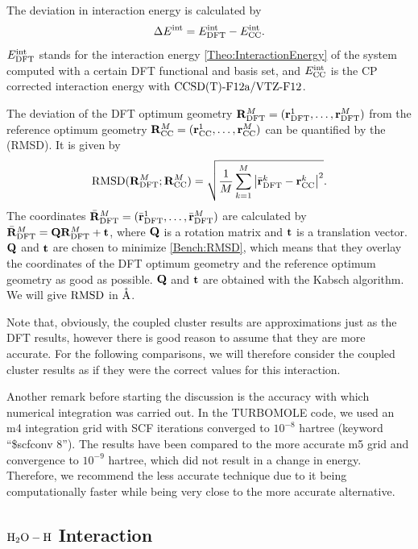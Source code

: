 The deviation in interaction energy is calculated by 
\newcommand\ecc{\enmat{\eint_{\te {CC}}}}
\begin{equation}
\Dl\eint=\eint\dft-\ecc.
\label{Bench:RefEnergy}
\end{equation}
$E^{\text{int}}_{\text{DFT}}$ stands for the interaction energy \eqref{Theo:InteractionEnergy} of
the system computed with a certain DFT functional and basis set, and $\ecc$ is
the CP corrected interaction energy with $\text{CCSD(T)-F12a}/\text{VTZ-F}12$.

The deviation of the DFT optimum geometry \mbox{$\mathbf{R}^M_{\text{DFT}}=(\mathbf{r}^1_{\text{DFT}},\ldots,\mathbf{r}^M_{\text{DFT}})$} from the reference optimum geometry
\mbox{$\mathbf{R}^M_{\text{CC}}=(\mathbf{r}^1_{\text{CC}},\ldots,\mathbf{r}^M_{\text{CC}})$} can be quantified by the  (RMSD). It is given by
\newcommand{\DRMSD}{\te{RMSD}}
\begin{equation}
\text{RMSD}(\mathbf{R}^M_{\text{DFT}};\mathbf{R}^M_{\text{CC}})=\sqrt{\frac 1 M \sum_{k=1}^M
\left|{\bar {\mathbf{r}}^k_{\text{DFT}}-\mathbf{r}^k_{\text{CC}}}\right|^2}.
\label{Bench:RMSD}
\end{equation}
The coordinates $\bar {\mathbf{R}}^M_{\text{DFT}}=(\bar {\mathbf{r}}^1_{\text{DFT}},\ldots,\bar {\mathbf{r}}^M_{\text{DFT}})$ are
calculated by $\bar {\mathbf{R}}^M_{\text{DFT}}= \mathbf{Q} \mathbf{R}^M_{\text{DFT}} + \mathbf{t}$, where $\mathbf{Q}$ is
a rotation matrix and $\mathbf{t}$ is a translation vector. $\mathbf{Q}$ and $\mathbf{t}$ are
chosen to minimize \eqref{Bench:RMSD}, which means that they overlay the
coordinates of the DFT optimum geometry and the reference optimum geometry as
good as possible. $\mathbf{Q}$ and $\mathbf{t}$ are obtained with the Kabsch
algorithm.\cite{Kabsch1978} We will give $\DRMSD$ in $\mathring{\text{A}}$.

Note that, obviously, the coupled cluster results are approximations just as the DFT results, however
there is good reason to assume that they are more accurate. For the following comparisons, we will
therefore consider the coupled cluster results as if they were the correct values for this
interaction.

Another remark before starting the discussion is the accuracy with which
numerical integration was carried out. In the \mbox{TURBOMOLE} code, we used an
m4 integration grid with SCF iterations converged to $10^{-8}$ hartree (keyword
``\$scfconv 8''). The results have been compared to the more accurate m5 grid
and convergence to $10^{-9}$ hartree, which did not result in a change in
energy.
Therefore, we recommend the less accurate technique due to it being
computationally faster while being very close to the more accurate alternative.

\subsection{$\mbox{\ensuremath{\text H _2 \text O-\text H}}$ Interaction}

